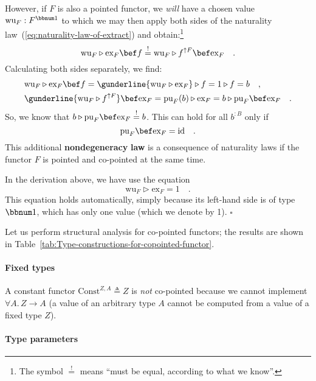 However, if $F$ is also a pointed functor, we \emph{will} have a
chosen value $\text{wu}_{F}:F^{\bbnum 1}$ to which we may then apply
both sides of the naturality law~(\ref{eq:naturality-law-of-extract})
and obtain:\footnote{The symbol $\overset{!}{=}$ means \textsf{``}must be equal, according to
what we know\textsf{''}.}
\[
\text{wu}_{F}\triangleright\text{ex}_{F}\bef f\overset{!}{=}\text{wu}_{F}\triangleright f^{\uparrow F}\bef\text{ex}_{F}\quad.
\]
Calculating both sides separately, we find:
\begin{align*}
 & \text{wu}_{F}\triangleright\text{ex}_{F}\bef f=\gunderline{\text{wu}_{F}\triangleright\text{ex}_{F}}\triangleright f=1\triangleright f=b\quad,\\
 & \gunderline{\text{wu}_{F}\triangleright f^{\uparrow F}}\bef\text{ex}_{F}=\text{pu}_{F}(b)\triangleright\text{ex}_{F}=b\triangleright\text{pu}_{F}\bef\text{ex}_{F}\quad.
\end{align*}
So, we know that $b\triangleright\text{pu}_{F}\bef\text{ex}_{F}\overset{!}{=}b$.
This can hold for all $b^{:B}$ only if 
\[
\text{pu}_{F}\bef\text{ex}_{F}=\text{id}\quad.
\]
This additional \textbf{nondegeneracy} \textbf{law}
is a consequence of naturality laws if the functor $F$ is pointed
and co-pointed at the same time.

In the derivation above, we have use the equation
\begin{equation}
\text{wu}_{F}\triangleright\text{ex}_{F}=1\quad.\label{eq:co-pointed-nondegeneracy-law-wu}
\end{equation}
 This equation holds automatically, simply because its left-hand side
is of type $\bbnum 1$, which has only one value (which we denote
by 1). $\square$

Let us perform structural analysis for co-pointed functors; the results
are shown in Table~\ref{tab:Type-constructions-for-copointed-functor}.

\paragraph{Fixed types}

A constant functor $\text{Const}^{Z,A}\triangleq Z$ is \emph{not}
co-pointed because we cannot implement $\forall A.\,Z\rightarrow A$
(a value of an arbitrary type $A$ cannot be computed from a value
of a fixed type $Z$).

\paragraph{Type parameters}

